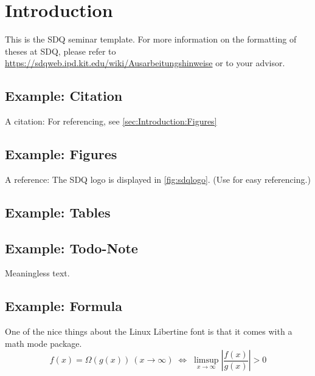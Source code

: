 
\section{Introduction}
\label{ch:Introduction}


This is the SDQ seminar template.
For more information on the formatting of theses at SDQ, please refer to
\url{https://sdqweb.ipd.kit.edu/wiki/Ausarbeitungshinweise} or to your advisor.

\subsection{Example: Citation}
\label{sec:Introduction:Citation}
A citation: \cite{becker2008a} For referencing, see \autoref{sec:Introduction:Figures}

\subsection{Example: Figures}
\label{sec:Introduction:Figures}
A reference: The SDQ logo is displayed in \autoref{fig:sdqlogo}. 
(Use  for easy referencing.) 

\subsection{Example: Tables}
\label{sec:Introduction:Tables}

\subsection{Example: Todo-Note}
Meaningless text.

\subsection{Example: Formula}
One of the nice things about the Linux Libertine font is that it comes with
a math mode package.
\begin{displaymath}
f(x)=\Omega(g(x))\ (x\rightarrow\infty)\;\Leftrightarrow\;
\limsup_{x \to \infty} \left|\frac{f(x)}{g(x)}\right|> 0
\end{displaymath}

